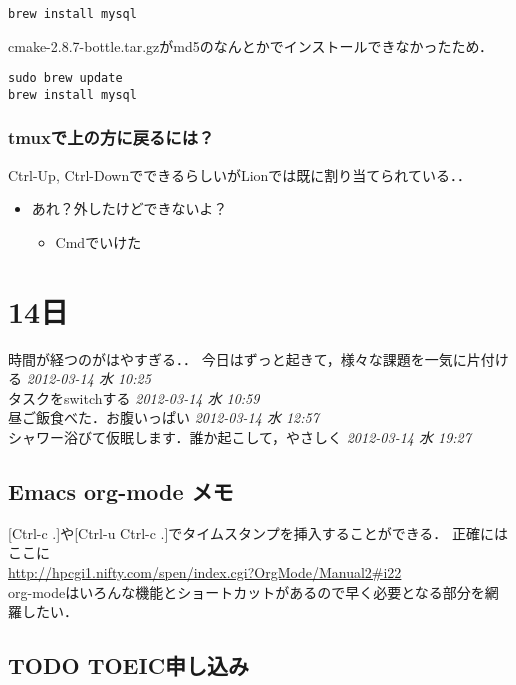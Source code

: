 \documentclass[11pt]{article}
\begin{document}
\begin{verbatim}
brew install mysql
\end{verbatim}
cmake-2.8.7-bottle.tar.gzがmd5のなんとかでインストールできなかったため．

\begin{verbatim}
sudo brew update
brew install mysql
\end{verbatim}
\subsubsection{tmuxで上の方に戻るには？}
\label{sec-5-4-3}

Ctrl-Up, Ctrl-DownでできるらしいがLionでは既に割り当てられている．．
\begin{itemize}
\item あれ？外したけどできないよ？
\begin{itemize}
\item Cmdでいけた
\end{itemize}
\end{itemize}
\section{14日}
\label{sec-6}

時間が経つのがはやすぎる．．
今日はずっと起きて，様々な課題を一気に片付ける \textit{2012-03-14 水 10:25}
\\
タスクをswitchする \textit{2012-03-14 水 10:59} 
\\
昼ご飯食べた．お腹いっぱい \textit{2012-03-14 水 12:57}
\\
シャワー浴びて仮眠します．誰か起こして，やさしく \textit{2012-03-14 水 19:27}
\\
\subsection{Emacs org-mode メモ}
\label{sec-6-1}

[Ctrl-c .]や[Ctrl-u Ctrl-c .]でタイムスタンプを挿入することができる．
正確にはここに\\
\href{http://hpcgi1.nifty.com/spen/index.cgi?OrgMode/Manual2#i22}{http://hpcgi1.nifty.com/spen/index.cgi?OrgMode/Manual2\#i22} \\

org-modeはいろんな機能とショートカットがあるので早く必要となる部分を網羅したい．
\subsection{\textbf{TODO} TOEIC申し込み}
\label{sec-6-2}
\end{document}
